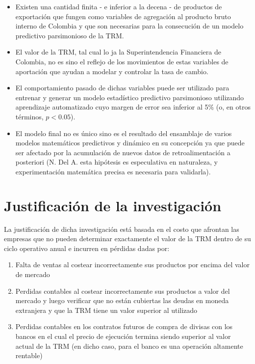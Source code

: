 \documentclass[letterpaper, spanish, 11pt]{report}
\begin{document}
\begin{itemize}
	\item Existen una cantidad finita - e inferior a la decena - de productos de exportación que fungen como variables de agregación al producto bruto interno de Colombia y que son necesarias para la consecución de un modelo predictivo parsimonioso de la TRM.
	\item El valor de la TRM, tal cual lo ja la Superintendencia Financiera de Colombia, no es sino el reflejo de los movimientos de estas variables de aportación que ayudan a modelar y controlar la tasa de cambio.
	\item El comportamiento pasado de dichas variables puede ser utilizado para entrenar y generar un modelo estadístico predictivo parsimonioso utilizando aprendizaje automatizado cuyo margen de error sea inferior al 5\% (o, en otros términos, \(p < 0.05\)).
	\item El modelo final no es único sino es el resultado del ensamblaje de varios modelos matemáticos predictivos y dinámico en su concepción ya que puede ser afectado por la acumulación de nuevos datos de retroalimentación a posteriori (N. Del A. esta hipótesis es especulativa en naturaleza, y experimentación matemática precisa es necesaria para validarla).
\end{itemize}

\section{Justificación de la investigación}
La justificación de dicha investigación está basada en el costo que afrontan las empresas que no pueden determinar exactamente el valor de la TRM dentro de su ciclo operativo anual e incurren en pérdidas dadas por:

\begin{enumerate}
	\item Falta de ventas al costear incorrectamente sus productos por encima del valor de mercado
	\item Perdidas contables al costear incorrectamente sus productos a valor del mercado y luego verificar que no están cubiertas las deudas en moneda extranjera y que la TRM tiene un valor superior al utilizado
	\item Perdidas contables en los contratos futuros de compra de divisas con los bancos en el cual el precio de ejecución termina siendo superior al valor actual de la TRM (en dicho caso, para el banco es una operación altamente rentable)
\end{enumerate}
\end{document}
